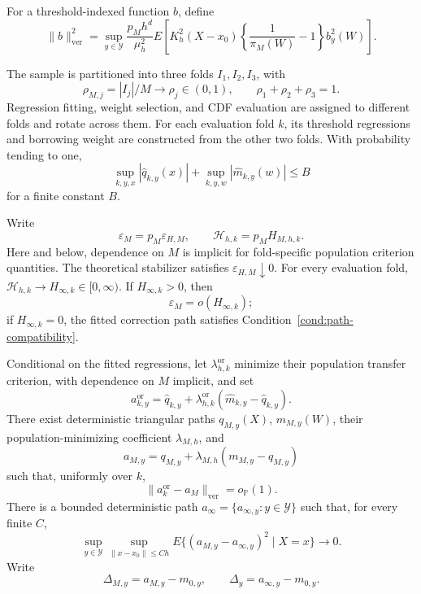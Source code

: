 For a threshold-indexed function \(b\), define
\begin{equation}
\|b\|_{\mathrm{ver}}^2
=
\sup_{y\in\mathcal Y}
\frac{p_Mh^d}{\mu_h^2}
E\left[
K_h^2(X-x_0)
\left\{\frac1{\pi_M(W)}-1\right\}
b_y^2(W)
\right].
\label{eq:local-ver-metric}
\end{equation}

\begin{assumption}
\label{cond:candidates}
The sample is partitioned into three folds \(I_1,I_2,I_3\), with
\[
\rho_{M,j}=|I_j|/M\to\rho_j\in(0,1),
\qquad
\rho_1+\rho_2+\rho_3=1.
\]
Regression fitting, weight selection, and CDF evaluation are assigned to different folds and rotate across them. For each evaluation fold \(k\), its threshold regressions and borrowing weight are constructed from the other two folds. With probability tending to one,
\[
\sup_{k,y,x}|\widehat q_{k,y}(x)|
+
\sup_{k,y,w}|\widehat m_{k,y}(w)|
\le B
\]
for a finite constant \(B\).

Write
\[
\varepsilon_M=p_M\varepsilon_{H,M},
\qquad
\mathcal H_{h,k}=p_MH_{M,h,k}.
\]
Here and below, dependence on \(M\) is implicit for fold-specific population criterion quantities. The theoretical stabilizer satisfies \(\varepsilon_{H,M}\downarrow0\). For every evaluation fold, \(\mathcal H_{h,k}\to H_{\infty,k}\in[0,\infty)\). If \(H_{\infty,k}>0\), then
\[
\varepsilon_M=o(H_{\infty,k});
\]
if \(H_{\infty,k}=0\), the fitted correction path satisfies Condition~\ref{cond:path-compatibility}.

Conditional on the fitted regressions, let \(\lambda_{h,k}^{\mathrm{or}}\) minimize their population transfer criterion, with dependence on \(M\) implicit, and set
\[
a_{k,y}^{\mathrm{or}}
=
\widehat q_{k,y}
+
\lambda_{h,k}^{\mathrm{or}}
(\widehat m_{k,y}-\widehat q_{k,y}).
\]
There exist deterministic triangular paths \(q_{M,y}(X)\), \(m_{M,y}(W)\), their population-minimizing coefficient \(\lambda_{M,h}\), and
\[
a_{M,y}
=
q_{M,y}
+
\lambda_{M,h}
(m_{M,y}-q_{M,y})
\]
such that, uniformly over \(k\),
\[
\|a_k^{\mathrm{or}}-a_M\|_{\mathrm{ver}}
=o_{\mathbb P}(1).
\]
There is a bounded deterministic path \(a_\infty=\{a_{\infty,y}:y\in\mathcal Y\}\) such that, for every finite \(C\),
\begin{equation}
\sup_{y\in\mathcal Y}\sup_{\|x-x_0\|\le Ch}
E\{(a_{M,y}-a_{\infty,y})^2\mid X=x\}
\to0.
\label{eq:path-limit}
\end{equation}
Write
\[
\Delta_{M,y}=a_{M,y}-m_{0,y},
\qquad
\Delta_y=a_{\infty,y}-m_{0,y}.
\]
\end{assumption}

